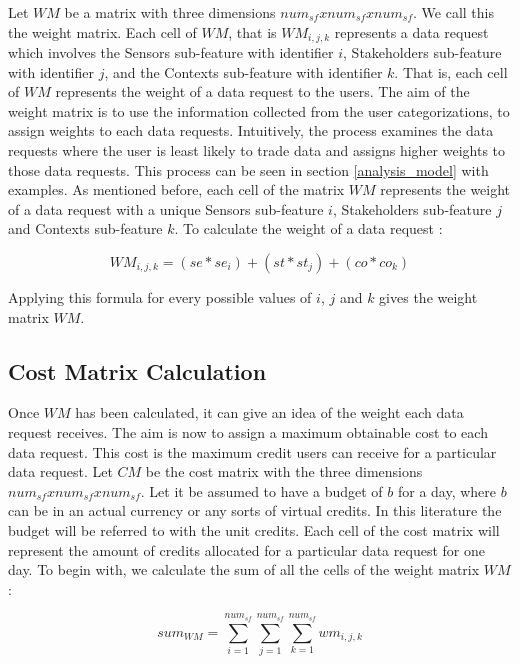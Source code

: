 Let $WM$  be a matrix with three dimensions $num_{sf} x num_{sf} x num_{sf} $. We call this the weight matrix.
Each cell of $WM$, that is $WM_{i,j,k}$ represents a data request which involves the Sensors sub-feature with identifier $i$, Stakeholders sub-feature with identifier $j$,
and the Contexts sub-feature with identifier $k$. That is, each cell of $WM$ represents the weight of a data request to the users. The aim of the weight matrix is to use the information collected from the user categorizations, to assign weights to each data requests. Intuitively, the process examines the
data requests where the user is least likely to trade data and assigns higher weights to those data requests. This process can be seen in
section \ref{analysis_model} with examples. As mentioned before, each cell of the matrix $WM$ represents the weight of a data request with a unique Sensors sub-feature $i$, Stakeholders sub-feature $j$ and Contexts sub-feature $k$. To calculate the weight of a data request :

\begin{equation}
WM_{i,j,k} = (se*se_{i}) + (st*st_{j}) + (co*co_{k})
\end{equation}

Applying this formula for every possible values of $i$, $j$ and $k$ gives the weight matrix $WM$.

\subsection{Cost Matrix Calculation}

Once $WM$ has been calculated, it can give an idea of the weight each data request receives. The aim is now to assign a maximum obtainable cost to each data request. This cost is the maximum credit users can receive for a particular data request. Let $CM$ be the cost matrix with the three dimensions $num_{sf} x num_{sf} x num_{sf} $.
Let it be assumed to have a budget of $b$ for a day, where
$b$ can be in an actual currency or any sorts of virtual credits. In this literature the budget will be referred to with the unit credits. Each cell of the cost matrix will represent the amount of credits allocated for a particular data request for one day.
To begin with, we calculate the sum of all the cells of the weight matrix $WM$:

\begin{equation}
sum_{WM} = \sum\limits_{i=1}^{num_{sf}} \sum\limits_{j=1}^{num_{sf}} \sum\limits_{k=1}^{num_{sf}} wm_{i,j,k}
\end{equation}

